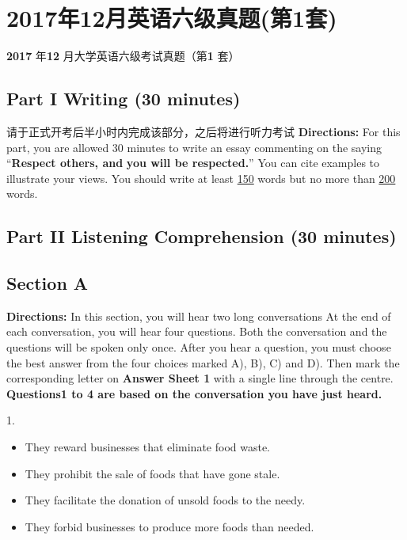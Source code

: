 \documentclass[UTF8,11pt]{ctexart}
\begin{document}
\section*{2017年12月英语六级真题(第1套)}
\textbf{2017} 年\textbf{12} 月大学英语六级考试真题（第\textbf{1} 套）


\subsection*{\textbf{Part I} \textbf{Writing} \textbf{(30 minutes)}}


请于正式开考后半小时内完成该部分，之后将进行听力考试 \textbf{Directions:} For this part, you are allowed 30 minutes to write an essay commenting on the saying “\textbf{Respect others, and} \textbf{you will be respected.}” You can cite examples to illustrate your views. You should write at least \uline{150} words but no more than \uline{200} words.


\subsection*{\textbf{Part II} \textbf{Listening Comprehension} \textbf{(30 minutes)}}


\subsection*{\textbf{Section A}}


\textbf{Directions:} In this section, you will hear two long conversations At the end of each conversation, you will hear four questions. Both the conversation and the questions will be spoken only once. After you hear a question, you must choose the best answer from the four choices marked A), B), C) and D). Then mark the corresponding letter on\textbf{ Answer Sheet 1} with a single line through the centre. \textbf{Questions1 to 4 are based on the conversation you have just heard.}


1.


\begin{itemize}[leftmargin=2em,itemsep=.2em,topsep=.4em]\item[A.] They reward businesses that eliminate food waste.
\item[B.] They prohibit the sale of foods that have gone stale.
\item[C.] They facilitate the donation of unsold foods to the needy.
\item[D.] They forbid businesses to produce more foods than needed.
\end{itemize}
\end{document}
